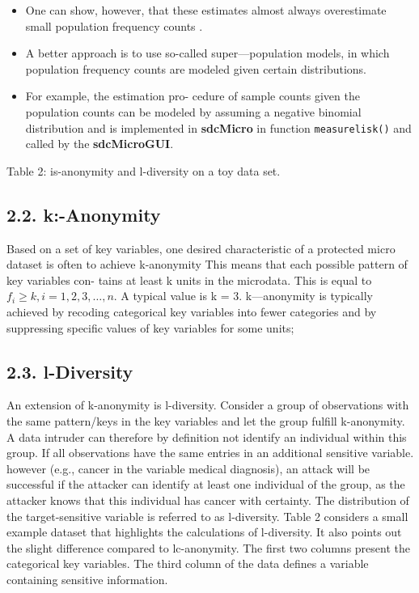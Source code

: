 \documentclass[]{article}
\begin{document}
\begin{itemize}
	\item One can show, however, that these estimates almost always overestimate small
	population frequency counts .
	
	\item A better approach is to use so-called super—population models, in which population frequency
	counts are modeled given certain distributions. 
	
	\item For example, the estimation pro-
	cedure of sample counts given the population counts can be modeled by assuming
	a negative binomial distribution and is implemented
	in \textbf{sdcMicro} in function \texttt{measurelisk()}
	and called by the
	\textbf{sdcMicroGUI}.
	
\end{itemize}


Table 2: is-anonymity and l-diversity on a toy data set.
\subsection*{2.2. k:-Anonymity}
Based on a set of key variables, one desired characteristic of a protected micro
dataset is often to achieve k-anonymity 
This means that each possible pattern of key variables con-
tains at least k units in the microdata. This is equal to $f_i \geq k, i=1,2,3,\ldots ,n$.  A
typical value is k = 3.
k—anonymity is typically achieved by recoding categorical key variables into fewer
categories and by suppressing speciﬁc values of key variables for some units;
\subsection*{2.3. l-Diversity}
An extension of k-anonymity is l-diversity. Consider
a group of observations with the same pattern/keys in the key variables and let
the group fulfill k-anonymity. A data intruder can therefore by deﬁnition not
identify an individual within this group. If all observations have the same entries
in an additional sensitive variable. however (e.g., cancer in the variable medical
diagnosis), an attack will be successful if the attacker can identify at least one
individual of the group, as the attacker knows that this individual has cancer
with certainty. The distribution of the target-sensitive variable is referred to as
l-diversity.
Table 2 considers a small example dataset that highlights the calculations of
l-diversity. It also points out the slight difference compared to lc-anonymity. The
ﬁrst two columns present the categorical key variables. The third column of the
data deﬁnes a variable containing sensitive information. 
\end{document}
